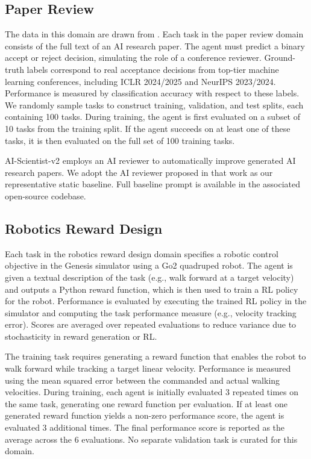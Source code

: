 \subsection{Paper Review}
\label{app:domain-paperreview}

The data in this domain are drawn from \citet{zhao2026apres}. Each task in the paper review domain consists of the full text of an AI research paper. The agent must predict a binary accept or reject decision, simulating the role of a conference reviewer. Ground-truth labels correspond to real acceptance decisions from top-tier machine learning conferences, including ICLR 2024/2025 and NeurIPS 2023/2024. Performance is measured by classification accuracy with respect to these labels. We randomly sample tasks to construct training, validation, and test splits, each containing 100 tasks. During training, the agent is first evaluated on a subset of 10 tasks from the training split. If the agent succeeds on at least one of these tasks, it is then evaluated on the full set of 100 training tasks.

AI-Scientist-v2 \citep{yamada2025ai} employs an AI reviewer to automatically improve generated AI research papers. We adopt the AI reviewer proposed in that work as our representative static baseline. Full baseline prompt is available in the associated open-source codebase.

\subsection{Robotics Reward Design}
\label{app:domain-genesis}

Each task in the robotics reward design domain specifies a robotic control objective in the Genesis simulator \citep{genesis2024} using a Go2 quadruped robot. The agent is given a textual description of the task (e.g., walk forward at a target velocity) and outputs a Python reward function, which is then used to train a RL policy \citep[i.e., PPO,][]{schulman2017proximal} for the robot. Performance is evaluated by executing the trained RL policy in the simulator and computing the task performance measure (e.g., velocity tracking error). Scores are averaged over repeated evaluations to reduce variance due to stochasticity in reward generation or RL.

The training task requires generating a reward function that enables the robot to walk forward while tracking a target linear velocity. Performance is measured using the mean squared error between the commanded and actual walking velocities. During training, each agent is initially evaluated 3 repeated times on the same task, generating one reward function per evaluation. If at least one generated reward function yields a non-zero performance score, the agent is evaluated 3 additional times. The final performance score is reported as the average across the 6 evaluations. No separate validation task is curated for this domain.

